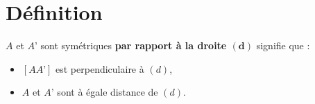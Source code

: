 \section{Définition}
    \begin{definition}
        $A$ et $A’$ sont symétriques \textbf{par rapport à la droite $\mathbf{(d)}$} signifie que :
        \begin{itemize}
            \item $[AA’]$ est perpendiculaire à $(d)$,
            \item $A$ et $A’$ sont à égale distance de $(d)$.
        \end{itemize}
    \end{definition}
